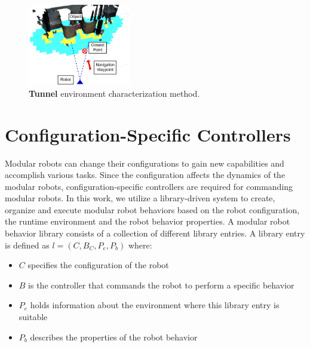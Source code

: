 \documentclass[conference]{IEEEtran}
\begin{document}
\begin{figure}
\begin{center}
\includegraphics[width=0.4\textwidth]{images/characterization.png}
\caption{\textbf{Tunnel} environment characterization method.}
\label{fig:characterization}
\end{center}
\end{figure}


\section{Configuration-Specific Controllers}
\label{sec:configuration-specifics}
Modular robots can change their configurations to gain new capabilities and accomplish various tasks.
Since the configuration affects the dynamics of the modular robots, configuration-specific controllers are required for commanding modular robots.
In this work, we utilize a library-driven system to create, organize and execute modular robot behaviors based on the robot configuration, the runtime environment and the robot behavior properties.
A modular robot behavior library consists of a collection of different library entries.
A library entry is defined as $l = (C,B_C,P_e,P_b)$ where:
\begin{itemize}
\item $C$ specifies the configuration of the robot
\item $B$ is the controller that commands the robot to perform a specific behavior
\item $P_e$ holds information about the environment where this library entry is suitable
\item $P_b$ describes the properties of the robot behavior
\end{itemize}
\end{document}
